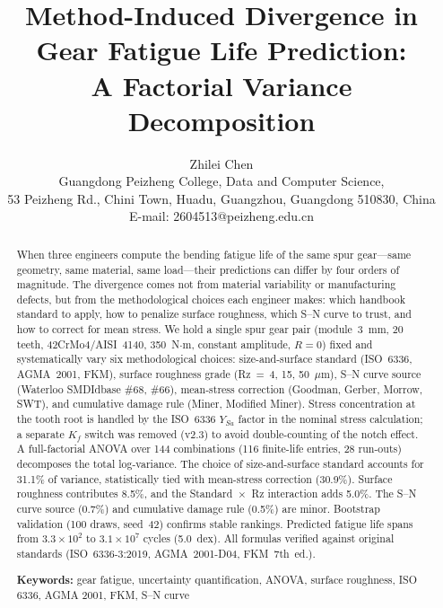 \documentclass[12pt,a4paper]{article}
\begin{document}
\title{\textbf{Method-Induced Divergence in Gear Fatigue Life Prediction:\\
A Factorial Variance Decomposition}}

\author{Zhilei Chen\\
Guangdong Peizheng College, Data and Computer Science,\\
53 Peizheng Rd., Chini Town, Huadu, Guangzhou, Guangdong 510830, China\\
E-mail: 2604513@peizheng.edu.cn}

\maketitle

\begin{abstract}
\label{sec:abstract}

When three engineers compute the bending fatigue life of the same spur
gear---same geometry, same material, same load---their predictions can
differ by four orders of magnitude. The divergence comes not from
material variability or manufacturing defects, but from the
methodological choices each engineer makes: which handbook standard to
apply, how to penalize surface roughness, which S--N curve to trust,
and how to correct for mean stress. We hold a single spur gear pair
(module~3~mm, 20 teeth, 42CrMo4/AISI~4140, 350~N$\cdot$m, constant
amplitude, $R=0$) fixed and systematically vary six methodological
choices: size-and-surface standard (ISO~6336, AGMA~2001, FKM), surface
roughness grade (Rz~=~4, 15, 50~$\mu$m), S--N curve source (Waterloo
SMDIdbase \#68, \#66), mean-stress correction (Goodman, Gerber, Morrow,
SWT), and cumulative damage rule
(Miner, Modified Miner). Stress concentration at the tooth root is
handled by the ISO~6336 $Y_{Sa}$ factor in the nominal stress
calculation; a separate $K_f$ switch was removed (v2.3) to avoid
double-counting of the notch effect. A full-factorial ANOVA over 144
combinations (116 finite-life entries, 28 run-outs) decomposes the
total log-variance. The choice of size-and-surface standard accounts
for 31.1\% of variance, statistically tied with mean-stress correction
(30.9\%). Surface roughness contributes 8.5\%, and the
Standard~$\times$~Rz interaction adds 5.0\%. The S--N curve source
(0.7\%) and cumulative damage rule (0.5\%) are minor. Bootstrap
validation (100 draws, seed~42) confirms stable rankings. Predicted
fatigue life spans from $3.3\times10^2$ to $3.1\times10^7$ cycles
(5.0~dex). All formulas verified against original standards
(ISO~6336-3:2019, AGMA~2001-D04, FKM~7th~ed.).

\textbf{Keywords:} gear fatigue, uncertainty quantification, ANOVA,
surface roughness, ISO 6336, AGMA 2001, FKM, S--N curve
\end{abstract}
\end{document}
